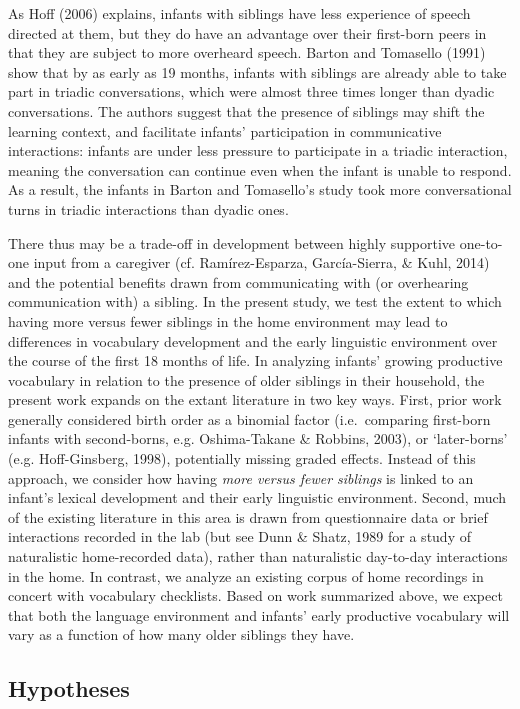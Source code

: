 \documentclass[
  english,
  man,floatsintext]{apa6}
\begin{document}
As Hoff (2006) explains, infants with siblings have less experience of speech directed at them, but they do have an advantage over their first-born peers in that they are subject to more overheard speech. Barton and Tomasello (1991) show that by as early as 19 months, infants with siblings are already able to take part in triadic conversations, which were almost three times longer than dyadic conversations. The authors suggest that the presence of siblings may shift the learning context, and facilitate infants' participation in communicative interactions: infants are under less pressure to participate in a triadic interaction, meaning the conversation can continue even when the infant is unable to respond. As a result, the infants in Barton and Tomasello's study took more conversational turns in triadic interactions than dyadic ones.

There thus may be a trade-off in development between highly supportive one-to-one input from a caregiver (cf. Ramírez-Esparza, García-Sierra, \& Kuhl, 2014) and the potential benefits drawn from communicating with (or overhearing communication with) a sibling. In the present study, we test the extent to which having more versus fewer siblings in the home environment may lead to differences in vocabulary development and the early linguistic environment over the course of the first 18 months of life. In analyzing infants' growing productive vocabulary in relation to the presence of older siblings in their household, the present work expands on the extant literature in two key ways. First, prior work generally considered birth order as a binomial factor (i.e.~comparing first-born infants with second-borns, e.g. Oshima-Takane \& Robbins, 2003), or `later-borns' (e.g. Hoff-Ginsberg, 1998), potentially missing graded effects. Instead of this approach, we consider how having \emph{more versus fewer siblings} is linked to an infant's lexical development and their early linguistic environment. Second, much of the existing literature in this area is drawn from questionnaire data or brief interactions recorded in the lab (but see Dunn \& Shatz, 1989 for a study of naturalistic home-recorded data), rather than naturalistic day-to-day interactions in the home. In contrast, we analyze an existing corpus of home recordings in concert with vocabulary checklists. Based on work summarized above, we expect that both the language environment and infants' early productive vocabulary will vary as a function of how many older siblings they have.

\hypertarget{hypotheses}{%
\subsection{Hypotheses}\label{hypotheses}}
\end{document}
